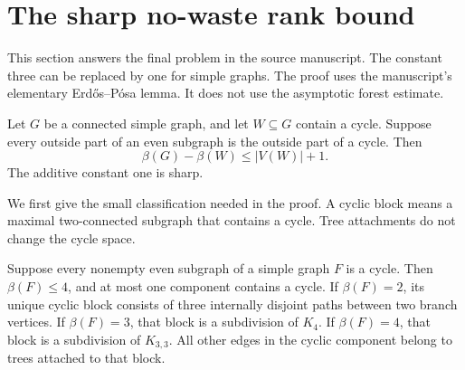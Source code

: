 \section{The sharp no-waste rank bound}\label{sec:nowaste-sharp}

This section answers the final problem in the source manuscript.
The constant three can be replaced by one for simple graphs.
The proof uses the manuscript's elementary Erd\H{o}s--P\'osa lemma.
It does not use the asymptotic forest estimate.

\begin{theorem}\label{thm:nowaste-one}
Let $G$ be a connected simple graph, and let $W\subseteq G$ contain a cycle.
Suppose every outside part of an even subgraph is the outside part of a cycle.
Then
\[
 \beta(G)-\beta(W)\le |V(W)|+1.
\]
The additive constant one is sharp.
\end{theorem}

We first give the small classification needed in the proof.
A cyclic block means a maximal two-connected subgraph that contains a cycle.
Tree attachments do not change the cycle space.

\begin{lemma}\label{lem:nowaste-small-cores}
Suppose every nonempty even subgraph of a simple graph $F$ is a cycle.
Then $\beta(F)\le4$, and at most one component contains a cycle.
If $\beta(F)=2$, its unique cyclic block consists of three internally disjoint paths between two branch vertices.
If $\beta(F)=3$, that block is a subdivision of $K_4$.
If $\beta(F)=4$, that block is a subdivision of $K_{3,3}$.
All other edges in the cyclic component belong to trees attached to that block.
\end{lemma}

